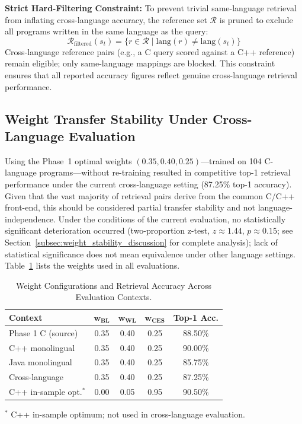 \textbf{Strict Hard-Filtering Constraint:} To prevent trivial same-language retrieval from inflating cross-language accuracy, the reference set $\mathcal{R}$ is pruned to exclude all programs written in the same language as the query:
\begin{equation}
    \mathcal{R}_{\text{filtered}}(s_t) = \{r \in \mathcal{R} \mid \text{lang}(r) \neq \text{lang}(s_t)\}
\end{equation}
Cross-language reference pairs (e.g., a C query scored against a C++ reference) remain eligible; only same-language mappings are blocked. This constraint ensures that all reported accuracy figures reflect genuine cross-language retrieval performance.

\subsection{Weight Transfer Stability Under Cross-Language Evaluation}
\label{subsec:weight_stability}

Using the Phase~1 optimal weights $(0.35, 0.40, 0.25)$---trained on 104 C-language programs---without re-training resulted in competitive top-1 retrieval performance under the current cross-language setting (87.25\% top-1 accuracy). Given that the vast majority of retrieval pairs derive from the common C/C++ front-end, this should be considered partial transfer stability and not language-independence. Under the conditions of the current evaluation, no statistically significant deterioration occurred (two-proportion z-test, $z \approx 1.44$, $p \approx 0.15$; see Section~\ref{subsec:weight_stability_discussion} for complete analysis); lack of statistical significance does not mean equivalence under other language settings. Table~\ref{tab:weight_stability} lists the weights used in all evaluations.
\begin{table}[ht]
\caption{Weight Configurations and Retrieval Accuracy Across Evaluation Contexts.}
\label{tab:weight_stability}
\centering
\begin{tabular}{|l|c|c|c|c|}
\hline
\textbf{Context} & $\boldsymbol{w_{\text{BL}}}$ & $\boldsymbol{w_{\text{WL}}}$ & $\boldsymbol{w_{\text{CES}}}$ & \textbf{Top-1 Acc.} \\
\hline
Phase 1 C (source) & 0.35 & 0.40 & 0.25 & 88.50\% \\
C++ monolingual & 0.35 & 0.40 & 0.25 & 90.00\% \\
Java monolingual & 0.35 & 0.40 & 0.25 & 85.75\% \\
Cross-language & 0.35 & 0.40 & 0.25 & 87.25\% \\
C++ in-sample opt.$^*$ & 0.00 & 0.05 & 0.95 & 90.50\% \\
\hline
\end{tabular}

\vspace{4pt}
{\raggedright \footnotesize $^*$ C++ in-sample optimum; not used in cross-language evaluation.\par}
\vspace{-1em} %
\end{table}